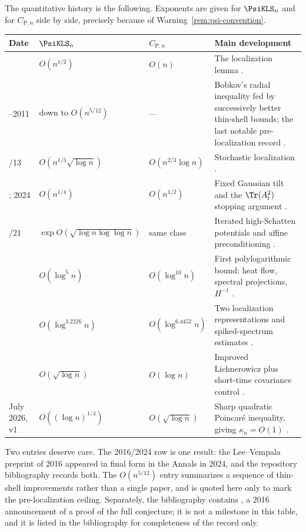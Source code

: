 \documentclass[../../main.tex]{subfiles}
\begin{document}
The quantitative history is the following. Exponents are given for $\PsiKLS_n$ and for
$C_{\mathrm P,n}$ side by side, precisely because of Warning~\ref{rem:psi-convention}.

\begin{center}
\begin{tabularx}{\textwidth}{@{}>{\raggedright\arraybackslash}p{}>{\raggedright\arraybackslash}p{}>{\raggedright\arraybackslash}p{}Y@{}}
\toprule
Date & $\PsiKLS_n$ & $C_{\mathrm P,n}$ & Main development \\
 & $O(n^{1/2})$ & $O(n)$ & The localization lemma \cite{KannanLovaszSimonovits1995}. \\
--2011 & down to $O(n^{5/12})$ & --- & Bobkov's radial inequality fed by successively better
thin-shell bounds; the last notable pre-localization record \cite{GuedonMilman2011}. \\
/13 & $O(n^{1/3}\sqrt{\log n})$ & $O(n^{2/3}\log n)$ & Stochastic localization
\cite{Eldan2013ThinShell}. \\
; 2024 & $O(n^{1/4})$ & $O(n^{1/2})$ & Fixed Gaussian tilt and the $\Tr(A_t^2)$ stopping
argument \cite{LeeVempala2018,LeeVempala2024}. \\
/21 & $\exp O(\sqrt{\log n\log\log n})$ & same class & Iterated high-Schatten potentials and
affine preconditioning \cite{Chen2021}. \\
 & $O(\log^5 n)$ & $O(\log^{10}n)$ & First polylogarithmic bound; heat flow, spectral
projections, $H^{-1}$ \cite{KlartagLehec2022Polylog}. \\
 & $O(\log^{3.2226}n)$ & $O(\log^{6.4452}n)$ & Two localization representations and
spiked-spectrum estimates \cite{JambulapatiLeeVempala2022KLS}. \\
 & $O(\sqrt{\log n})$ & $O(\log n)$ & Improved Lichnerowicz plus short-time covariance
control \cite{Klartag2023Logarithmic}. \\
\addlinespace
July 2026, v1 & $O((\log n)^{1/4})$ & $O(\sqrt{\log n})$ & Sharp quadratic Poincar\'e inequality,
giving $\kappa_n=O(1)$ \cite{Letwin2026QuadraticKLS}. \\
\bottomrule
\end{tabularx}
\end{center}

\begin{remark}
\label{rem:history-table-caveats}
Two entries deserve care. The 2016/2024 row is one result: the Lee--Vempala preprint of 2016
appeared in final form in the Annals in 2024, and the repository bibliography records both. The
$O(n^{5/12})$ entry summarizes a sequence of thin-shell improvements rather than a single paper,
and is quoted here only to mark the pre-localization ceiling. Separately, the bibliography
contains \cite{vempala2016kls}, a 2016 announcement of a proof of the full conjecture; it is not
a milestone in this table, and it is listed in the bibliography for completeness of the record
only.
\end{remark}
\end{document}
